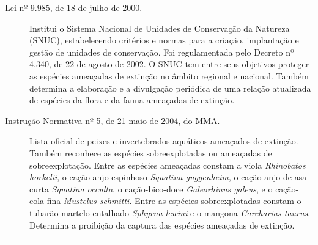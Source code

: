 \documentclass[a4paper,11pt,twoside,showtrims,onecolumn,openright,final]{memoir}
\begin{document}
\begin{table}
\begin{small}
\begin{description}
\item[Lei nº 9.985, de 18 de julho de 2000.] Institui o Sistema Nacional de Unidades de Conservação da Natureza (SNUC), 
                              estabelecendo critérios e normas para a criação, implantação e gestão de unidades de conservação.
                              Foi regulamentada pelo Decreto nº 4.340, de 22 de agosto de 2002. O SNUC tem entre seus objetivos
			      proteger as espécies ameaçadas de extinção no âmbito regional e nacional. Também determina a 
			      elaboração e a divulgação periódica de uma relação atualizada de espécies da flora e da fauna
			      ameaçadas de extinção.

\item[Instrução Normativa nº 5, de 21 maio de 2004, do MMA.] Lista oficial de peixes e invertebrados aquáticos
                              ameaçados de extinção. Também reconhece as espécies sobreexplotadas ou ameaçadas de sobreexplotação.
			      Entre as espécies ameaçadas constam a viola \emph{Rhinobatos horkelii}, 
			      o cação-anjo-espinhoso \emph{Squatina guggenheim},
			      o cação-anjo-de-asa-curta \emph{Squatina occulta},
			      o cação-bico-doce \emph{Galeorhinus galeus}, e 
			      o cação-cola-fina \emph{Mustelus schmitti}. Entre as espécies
			      sobreexplotadas constam o tubarão-martelo-entalhado \emph{Sphyrna lewini}
			      e o mangona \emph{Carcharias taurus}.
			      Determina a proibição da captura das espécies ameaçadas de extinção.

							 
\end{description}
\end{small}
\rule{\textwidth}{\normalrulethickness}
\end{table}

\end{document}
